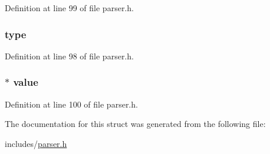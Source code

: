 Definition at line 99 of file parser.\+h.

\hypertarget{structfunction__argument__ast__node_aa117a93354fa3056f51378be7065ce33}{
\subsubsection[{type}]{ type}}\label{structfunction__argument__ast__node_aa117a93354fa3056f51378be7065ce33}


Definition at line 98 of file parser.\+h.

\hypertarget{structfunction__argument__ast__node_a6e64d94a98b3ee7a0420bb0f9a521227}{
\subsubsection[{value}]{$\ast$ value}}\label{structfunction__argument__ast__node_a6e64d94a98b3ee7a0420bb0f9a521227}


Definition at line 100 of file parser.\+h.



The documentation for this struct was generated from the following file\+:\begin{DoxyCompactItemize}
\item 
includes/\hyperlink{parser_8h}{parser.\+h}\end{DoxyCompactItemize}
